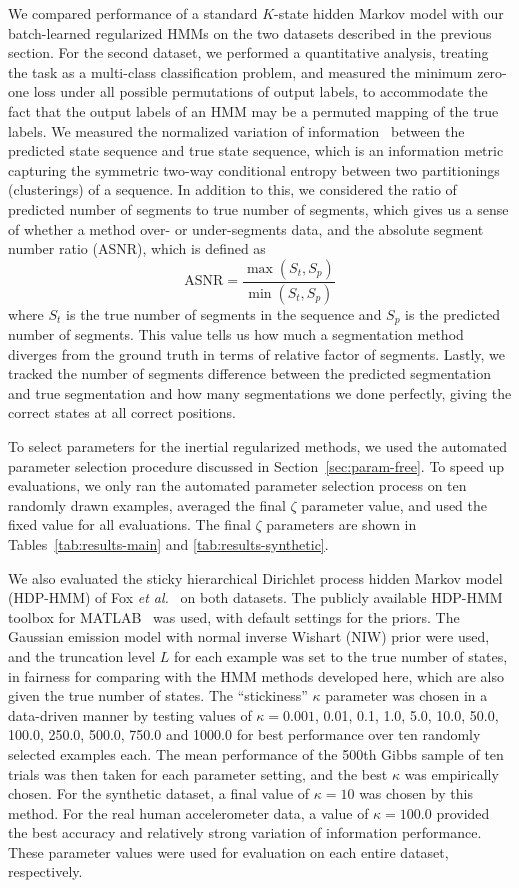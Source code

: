 \documentclass[letterpaper]{article}
\begin{document}
We compared performance of a standard $K$-state hidden Markov model with our batch-learned regularized HMMs on the two datasets described in the previous section. For the second dataset, we performed a quantitative analysis, treating the task as a multi-class classification problem, and measured the minimum zero-one loss under all possible permutations of output labels, to accommodate the fact that the output labels of an HMM may be a permuted mapping of the true labels. We measured the normalized variation of information~\cite{meila} between the predicted state sequence and true state sequence, which is an information metric capturing the symmetric two-way conditional entropy between two partitionings (clusterings) of a sequence.  In addition to this, we considered the ratio of predicted number of segments to true number of segments, which gives us a sense of whether a method over- or under-segments data, and the absolute segment number ratio (ASNR), which is defined as
\[
    \text{ASNR} = \frac{\max(S_t, S_p)}{\min(S_t, S_p)}
\]
where $S_t$ is the true number of segments in the sequence and $S_p$ is the predicted number of segments. This value tells us how much a segmentation method diverges from the ground truth in terms of relative factor of segments. Lastly, we tracked the number of segments difference between the predicted segmentation and true segmentation and how many segmentations we done perfectly, giving the correct states at all correct positions.

To select parameters for the inertial regularized methods, we used the automated parameter selection procedure discussed in Section~\ref{sec:param-free}. To speed up evaluations, we only ran the automated parameter selection process on ten randomly drawn examples, averaged the final $\zeta$ parameter value, and used the fixed value for all evaluations. The final $\zeta$ parameters are shown in Tables~\ref{tab:results-main} and \ref{tab:results-synthetic}.

We also evaluated the sticky hierarchical Dirichlet process hidden Markov model (HDP-HMM) of Fox \emph{et al.}~\cite{fox2011sticky} on both datasets. The publicly available HDP-HMM toolbox for MATLAB~\cite{HDP-HMM-TOOLKIT} was used, with default settings for the priors. The Gaussian emission model with normal inverse Wishart (NIW) prior were used, and the truncation level $L$ for each example was set to the true number of states, in fairness for comparing with the HMM methods developed here, which are also given the true number of states. The ``stickiness'' $\kappa$ parameter was chosen in a data-driven manner by testing values of $\kappa=0.001$, 0.01, 0.1, 1.0, 5.0, 10.0, 50.0, 100.0, 250.0, 500.0, 750.0 and 1000.0 for best performance over ten randomly selected examples each. The mean performance of the 500th Gibbs sample of ten trials was then taken for each parameter setting, and the best $\kappa$ was empirically chosen. For the synthetic dataset, a final value of $\kappa=10$ was chosen by this method. For the real human accelerometer data, a value of $\kappa=100.0$ provided the best accuracy and relatively strong variation of information performance. These parameter values were used for evaluation on each entire dataset, respectively.
\end{document}
